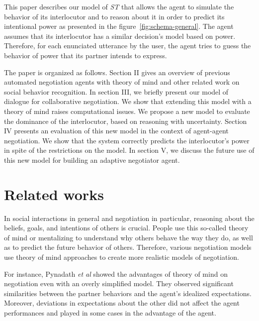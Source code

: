 \documentclass[conference, letterpaper]{IEEEtran}
\begin{document}
		 This paper describes our model of \emph{ST} that allows the agent to simulate the behavior of its interlocutor and to reason about it in order to predict its intentional power as presented in the figure~\ref{fig:schema-general}. The agent assumes that its interlocutor has a similar decision's model based on power. Therefore, for each enunciated utterance by the user, the agent tries to guess the behavior of power that its partner intends to express. 

		The paper is organized as follows. Section II gives an overview of previous automated negotiation agents with theory of mind and other related work on social behavior recognition. In section III, we briefly present our model of dialogue for collaborative negotiation. We show that extending this model with a theory of mind raises computational issues. We propose a new model to evaluate the dominance of the interlocutor, based on reasoning with uncertainty. Section IV presents an evaluation of this new model in the context of agent-agent negotiation. We show that the system correctly predicts the interlocutor's power in spite of the restrictions on the model. In section V, we discuss the future use of this new model for building an adaptive negotiator agent.
	
	
	\section{Related works}
	
	In social interactions in general and negotiation in particular, reasoning about the beliefs, goals, and intentions of others is crucial. People use this so-called theory of mind \cite{premack1978does} or mentalizing to understand why others behave the way they do, as well as to predict the future behavior of others. Therefore, various negotiation models use theory of mind approaches to create  more realistic models of negotiation. 
	
	For instance, Pynadath \textit{et al} \cite{pynadath2013you} showed the advantages of theory of mind on negotiation even with an overly simplified model. They observed significant similarities between	the partner behaviors and the agent's idealized expectations. Moreover, deviations in expectations about the other did not affect the agent performances and played in some cases in the advantage of the agent.
	
\end{document}
